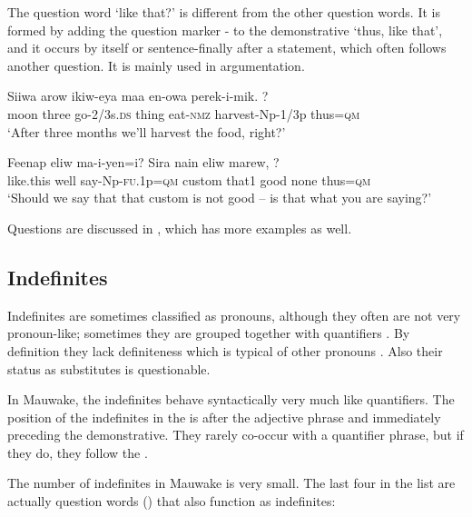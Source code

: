 The question word  `like that?' is different from the other question words. It is formed by adding the question marker - to the demonstrative  `thus, like that', and it occurs by itself or sentence-finally after a statement, which often follows another question. It is mainly used in argumentation. 

\ea%
\label{ex:3:x1194}
\gll Siiwa arow ikiw-eya maa en-owa perek-i-mik. ? \\
moon three go-2/3s.\textsc{ds} thing eat-\textsc{nmz} harvest-Np-1/3p thus=\textsc{qm}\\
\glt`After three months we'll harvest the food, right?'
\z

\ea%
\label{ex:3:x1195}
\gll Feenap eliw ma-i-yen=i? Sira nain eliw marew, ?\\
like.this well say-Np-\textsc{fu}.1p=\textsc{qm} custom that1 good none thus=\textsc{qm}\\
\glt`Should we say that that custom is not good -- is that what you are saying?'
\z

Questions are discussed in , which has more examples as well.

\subsection{Indefinites}\label{sec:3.7.2}
{}
Indefinites are sometimes classified as pronouns, although they often are not very pronoun-like; sometimes they are grouped together with quantifiers \citep[81]{HakulinenEtAl1979}%
. By definition they lack definiteness which is typical of other pronouns \citep[376]{QuirkEtAl1985}. Also their status as  substitutes is questionable.

In Mauwake, the indefinites behave syntactically very much like quantifiers. The position of the indefinites in the  is after the adjective phrase and immediately preceding the demonstrative. They rarely co-occur with a quantifier phrase, but if they do, they follow the .

The number of indefinites in Mauwake is very small. The last four in the list are actually question words () that also function as indefinites:

